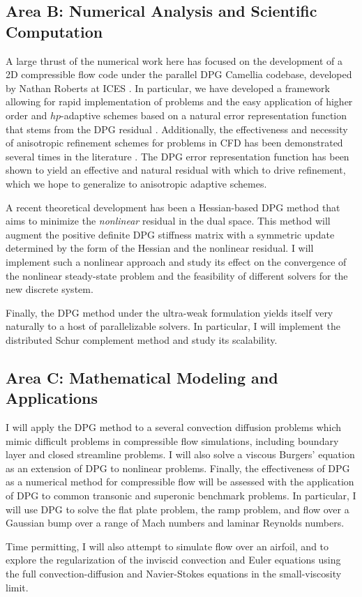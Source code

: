 \documentclass[12pt,letterpaper,oneside]{article}
\begin{document}
\subsection*{Area B: Numerical Analysis and Scientific Computation}

A large thrust of the numerical work here has focused on the development of a 2D compressible flow code under the parallel DPG Camellia codebase, developed by Nathan Roberts at ICES \cite{Camellia}.  In particular, we have developed a framework allowing for rapid implementation of problems and the easy application of higher order and $hp$-adaptive schemes based on a natural error representation function that stems from the DPG residual \cite{DPG2, DPG3}. Additionally, the effectiveness and necessity of anisotropic refinement schemes for problems in CFD has been demonstrated several times in the literature \cite{anisotropy1,anisotropy2}. The DPG error representation function has been shown to yield an effective and natural residual with which to drive refinement, which we hope to generalize to anisotropic adaptive schemes. 

A recent theoretical development has been a Hessian-based DPG method that aims to minimize the \emph{nonlinear} residual in the dual space.  This method will augment the positive definite DPG stiffness matrix with a symmetric update determined by the form of the Hessian and the nonlinear residual.  I will implement such a nonlinear approach and study its effect on the convergence of the nonlinear steady-state problem and the feasibility of different solvers for the new discrete system.  

Finally, the DPG method under the ultra-weak formulation yields itself very naturally to a host of parallelizable solvers.  In particular, I will implement the distributed Schur complement method and study its scalability.  

\subsection*{Area C: Mathematical Modeling and Applications}

I will apply the DPG method to a several convection diffusion problems which mimic difficult problems in compressible flow simulations, including boundary layer and closed streamline problems.  I will also solve a viscous Burgers' equation as an extension of DPG to nonlinear problems.  Finally, the effectiveness of DPG as a numerical method for compressible flow will be assessed with the application of DPG to common transonic and superonic benchmark problems.  In particular, I will use DPG to solve the flat plate problem, the ramp problem, and flow over a Gaussian bump over a range of Mach numbers and laminar Reynolds numbers. 

Time permitting, I will also attempt to simulate flow over an airfoil, and to explore the regularization of the inviscid convection and Euler equations using the full convection-diffusion and Navier-Stokes equations in the small-viscosity limit.  




\end{document}

